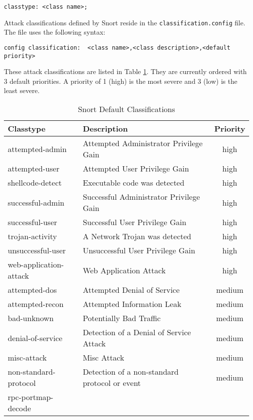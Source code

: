 \documentclass[english]{report}
\begin{document}
\begin{verbatim}
classtype: <class name>;
\end{verbatim}
Attack classifications defined by Snort reside in the \texttt{classification.config}
file. The file uses the following syntax:

\begin{verbatim}
config classification:  <class name>,<class description>,<default priority>
\end{verbatim}
These attack classifications are listed in Table
\ref{Snort Default Classifications}. They
are currently ordered with 3 default priorities. A priority of 1 (high) is the
most severe and 3 (low) is the least severe.


\begin{center}
\begin{longtable}{|p{2in}|p{2.5in}|c|}
\caption{Snort Default Classifications \label{Snort Default Classifications}} \\
\hline 
Classtype & Description & Priority \\
\hline
\hline 
attempted-admin&
Attempted Administrator Privilege Gain & high \\
\hline 
attempted-user&
Attempted User Privilege Gain & high\\
\hline 
shellcode-detect&
Executable code was detected & high\\
\hline 
successful-admin&
Successful Administrator Privilege Gain & high\\
\hline 
successful-user&
Successful User Privilege Gain & high\\
\hline 
trojan-activity&
A Network Trojan was detected & high\\
\hline 
unsuccessful-user&
Unsuccessful User Privilege Gain & high\\
\hline 
web-application-attack&
Web Application Attack & high\\
\hline
attempted-dos&
Attempted Denial of Service & medium\\
\hline 
attempted-recon&
Attempted Information Leak & medium\\
\hline 
bad-unknown&
Potentially Bad Traffic & medium\\
\hline 
denial-of-service&
Detection of a Denial of Service Attack & medium\\
\hline 
misc-attack&
Misc Attack & medium\\
\hline 
non-standard-protocol&
Detection of a non-standard protocol or event & medium\\
\hline 
rpc-portmap-decode&

\end{longtable}
\end{center}
\end{document}
